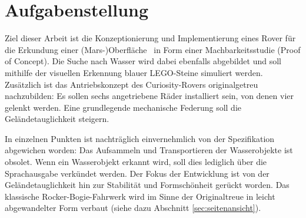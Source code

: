\section{Aufgabenstellung}
\label{sec:aufgabe}

Ziel dieser Arbeit ist die \glqq Konzeptionierung und Implementierung eines Rover für die Erkundung einer (Mars-)Oberfläche\grqq\ \cite{mueller2019} in Form einer Machbarkeitsstudie (Proof of Concept).
Die Suche nach Wasser wird dabei ebenfalls abgebildet und soll mithilfe der visuellen Erkennung blauer LEGO-Steine simuliert werden.
Zusätzlich ist das Antriebskonzept des Curiosity-Rovers originalgetreu nachzubilden: Es sollen sechs angetriebene Räder installiert sein, von denen vier gelenkt werden.
Eine grundlegende mechanische Federung soll die Geländetauglichkeit steigern.

In einzelnen Punkten ist nachträglich einvernehmlich von der Spezifikation abgewichen worden:
Das Aufsammeln und Transportieren der Wasserobjekte ist obsolet.
Wenn ein Wasserobjekt erkannt wird, soll dies lediglich über die Sprachausgabe verkündet werden.
Der Fokus der Entwicklung ist von der Geländetauglichkeit hin zur Stabilität und Formschönheit gerückt worden.
Das klassische Rocker-Bogie-Fahrwerk wird im Sinne der Originaltreue in leicht abgewandelter Form verbaut (siehe dazu Abschnitt \ref{sec:seitenansicht}).